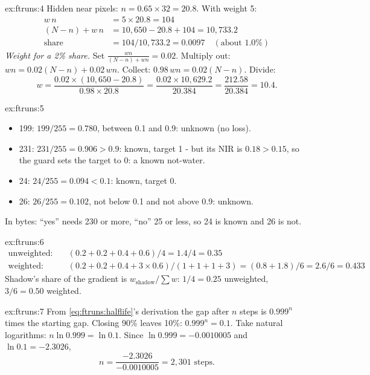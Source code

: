 \begin{solution}{ex:ftruns:4}
Hidden near pixels: $n = 0.65 \times 32 = 20.8$. With weight 5:
\begin{align*}
w\,n &= 5 \times 20.8 = 104\\
(N - n) + w\,n &= 10{,}650 - 20.8 + 104 = 10{,}733.2\\
\text{share} &= 104 / 10{,}733.2 = 0.0097 \quad (\text{about } 1.0\%)
\end{align*}
\emph{Weight for a 2\% share.} Set $\frac{w n}{(N - n) + w n} = 0.02$. Multiply out: $w n = 0.02 (N - n) + 0.02\,w n$.
Collect: $0.98\,w n = 0.02 (N - n)$. Divide:
\[
w = \frac{0.02 \times (10{,}650 - 20.8)}{0.98 \times 20.8} = \frac{0.02 \times 10{,}629.2}{20.384}
  = \frac{212.58}{20.384} = 10.4 .
\]
\end{solution}

\begin{solution}{ex:ftruns:5}
\begin{itemize}
\item 199: $199 / 255 = 0.780$, between 0.1 and 0.9: unknown (no loss).
\item 231: $231 / 255 = 0.906 > 0.9$: known, target 1 - but its NIR is $0.18 > 0.15$, so the guard sets the target to
  0: a known not-water.
\item 24: $24 / 255 = 0.094 < 0.1$: known, target 0.
\item 26: $26 / 255 = 0.102$, not below 0.1 and not above 0.9: unknown.
\end{itemize}
In bytes: ``yes'' needs 230 or more, ``no'' 25 or less, so 24 is known and 26 is not.
\end{solution}

\begin{solution}{ex:ftruns:6}
\begin{align*}
\text{unweighted:}\quad & (0.2 + 0.2 + 0.4 + 0.6) / 4 = 1.4 / 4 = 0.35\\
\text{weighted:}\quad & (0.2 + 0.2 + 0.4 + 3 \times 0.6) / (1 + 1 + 1 + 3) = (0.8 + 1.8) / 6 = 2.6 / 6 = 0.433
\end{align*}
Shadow's share of the gradient is $w_\text{shadow} / \sum w$: $1/4 = 0.25$ unweighted, $3/6 = 0.50$ weighted.
\end{solution}

\begin{solution}{ex:ftruns:7}
From \eqref{eq:ftruns:halflife}'s derivation the gap after $n$ steps is $0.999^n$ times the starting gap. Closing 90\%
leaves 10\%: $0.999^n = 0.1$. Take natural logarithms: $n \ln 0.999 = \ln 0.1$. Since $\ln 0.999 = -0.0010005$ and $\ln
0.1 = -2.3026$,
\[
n = \frac{-2.3026}{-0.0010005} = 2{,}301 \text{ steps.}
\]
\end{solution}
